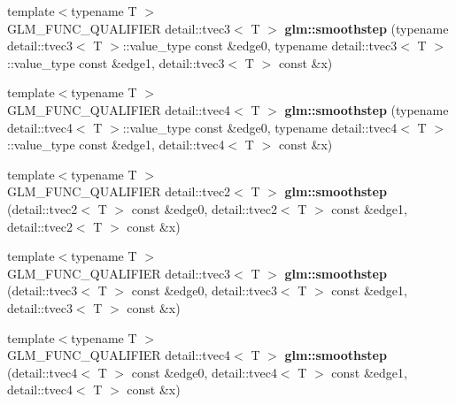 \begin{DoxyCompactItemize}
\item 
\hypertarget{namespaceglm_ad4f7ebb9a2c7c0980deb0580f951ea75}{}{\footnotesize template$<$typename T $>$ }\\G\+L\+M\+\_\+\+F\+U\+N\+C\+\_\+\+Q\+U\+A\+L\+I\+F\+I\+E\+R detail\+::tvec3$<$ T $>$ {\bfseries glm\+::smoothstep} (typename detail\+::tvec3$<$ T $>$\+::value\+\_\+type const \&edge0, typename detail\+::tvec3$<$ T $>$\+::value\+\_\+type const \&edge1, detail\+::tvec3$<$ T $>$ const \&x)\label{namespaceglm_ad4f7ebb9a2c7c0980deb0580f951ea75}

\item 
\hypertarget{namespaceglm_a17525ba6123f56066046fe07b127e006}{}{\footnotesize template$<$typename T $>$ }\\G\+L\+M\+\_\+\+F\+U\+N\+C\+\_\+\+Q\+U\+A\+L\+I\+F\+I\+E\+R detail\+::tvec4$<$ T $>$ {\bfseries glm\+::smoothstep} (typename detail\+::tvec4$<$ T $>$\+::value\+\_\+type const \&edge0, typename detail\+::tvec4$<$ T $>$\+::value\+\_\+type const \&edge1, detail\+::tvec4$<$ T $>$ const \&x)\label{namespaceglm_a17525ba6123f56066046fe07b127e006}

\item 
\hypertarget{namespaceglm_af602ff787e99445553837e916d4268f8}{}{\footnotesize template$<$typename T $>$ }\\G\+L\+M\+\_\+\+F\+U\+N\+C\+\_\+\+Q\+U\+A\+L\+I\+F\+I\+E\+R detail\+::tvec2$<$ T $>$ {\bfseries glm\+::smoothstep} (detail\+::tvec2$<$ T $>$ const \&edge0, detail\+::tvec2$<$ T $>$ const \&edge1, detail\+::tvec2$<$ T $>$ const \&x)\label{namespaceglm_af602ff787e99445553837e916d4268f8}

\item 
\hypertarget{namespaceglm_ae5221c42b168a958dcc60b053d8610c1}{}{\footnotesize template$<$typename T $>$ }\\G\+L\+M\+\_\+\+F\+U\+N\+C\+\_\+\+Q\+U\+A\+L\+I\+F\+I\+E\+R detail\+::tvec3$<$ T $>$ {\bfseries glm\+::smoothstep} (detail\+::tvec3$<$ T $>$ const \&edge0, detail\+::tvec3$<$ T $>$ const \&edge1, detail\+::tvec3$<$ T $>$ const \&x)\label{namespaceglm_ae5221c42b168a958dcc60b053d8610c1}

\item 
\hypertarget{namespaceglm_a76ad1cbce32a29bc7eb7d6c2a3a30330}{}{\footnotesize template$<$typename T $>$ }\\G\+L\+M\+\_\+\+F\+U\+N\+C\+\_\+\+Q\+U\+A\+L\+I\+F\+I\+E\+R detail\+::tvec4$<$ T $>$ {\bfseries glm\+::smoothstep} (detail\+::tvec4$<$ T $>$ const \&edge0, detail\+::tvec4$<$ T $>$ const \&edge1, detail\+::tvec4$<$ T $>$ const \&x)\label{namespaceglm_a76ad1cbce32a29bc7eb7d6c2a3a30330}


\end{DoxyCompactItemize}

